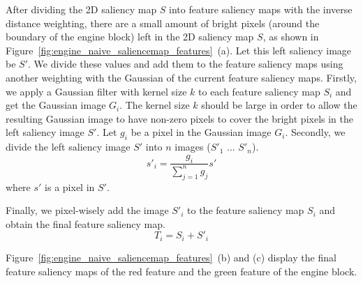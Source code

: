 After dividing the 2D saliency map $ S $ into feature saliency maps with the inverse distance weighting, there are a small amount of bright pixels (around the boundary of the engine block) left in the 2D saliency map $ S $, as shown in Figure~\ref{fig:engine_naive_saliencemap_features}~(a). Let this left saliency image be $ S' $.
We divide these values and add them to the feature saliency maps using another weighting with the Gaussian of the current feature saliency maps.
Firstly, we apply a Gaussian filter with kernel size $ k $ to each feature saliency map $ S_{i} $ and get the Gaussian image $ G_{i} $.
The kernel size $ k $ should be large in order to allow the resulting Gaussian image to have non-zero pixels to cover the bright pixels in the left saliency image $ S' $.
Let $ g_{i} $ be a pixel in the Gaussian image $ G_{i} $.
Secondly, we divide the left saliency image $ S' $ into $ n $ images ($ S'_{1} $ ... $ S'_{n} $).
\[ s'_{i} = \frac{ g_{i} }{ \sum_{j=1}^{n} g_{j} }s' \]
where $ s' $ is a pixel in $ S' $.

Finally, we pixel-wisely add the image $ S'_{i} $ to the feature saliency map $ S_{i} $ and obtain the final feature saliency map.
\[ T_{i} =S_{i}+S'_{i}\]

Figure~\ref{fig:engine_naive_saliencemap_features}~(b) and (c) display the final feature saliency maps of the red feature and the green feature of the engine block.

